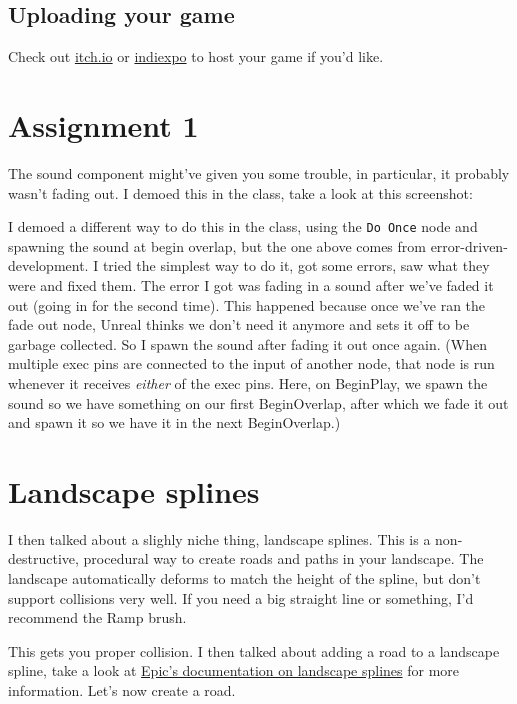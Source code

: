 \documentclass{article}
\begin{document}
	\subsection{Uploading your game}
	Check out \href{https://itch.io/}{itch.io} or \href{https://www.indiexpo.net/}{indiexpo} to host your game if you'd like.
	
	\newpage

	\section{Assignment 1}
	The sound component might've given you some trouble, in particular, it probably wasn't fading out. I demoed this in the class, take a look at this screenshot:
	\img{}

	I demoed a different way to do this in the class, using the \verb|Do Once| node and spawning the sound at begin overlap, but the one above comes from error-driven-development. I tried the simplest way to do it, got some errors, saw what they were and fixed them. The error I got was fading in a sound after we've faded it out (going in for the second time). This happened because once we've ran the fade out node, Unreal thinks we don't need it anymore and sets it off to be garbage collected. So I spawn the sound after fading it out once again. (When multiple exec pins are connected to the input of another node, that node is run whenever it receives \emph{either} of the exec pins. Here, on BeginPlay, we spawn the sound so we have something on our first BeginOverlap, after which we fade it out and spawn it so we have it in the next BeginOverlap.)

	\section{Landscape splines}
	I then talked about a slighly niche thing, landscape splines. This is a non-destructive, procedural way to create roads and paths in your landscape. The landscape automatically deforms to match the height of the spline, but don't support collisions very well. If you need a big straight line or something, I'd recommend the Ramp brush.


	This gets you proper collision. I then talked about adding a road to a landscape spline, take a look at \href{https://dev.epicgames.com/documentation/en-us/unreal-engine/landscape-splines-in-unreal-engine}{Epic's documentation on landscape splines} for more information. Let's now create a road.
\newpage
\end{document}
